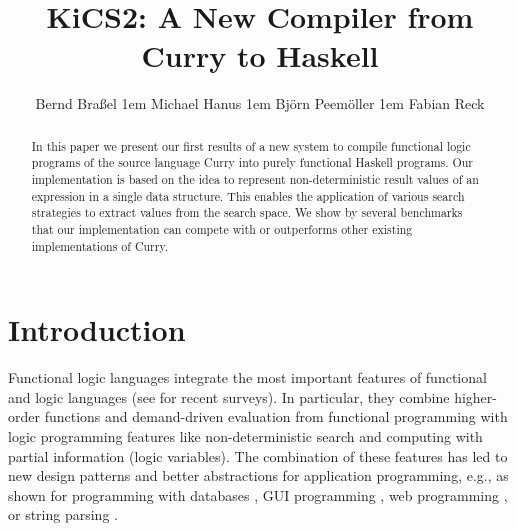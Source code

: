 \documentclass{llncs}
\begin{document}
\pagestyle{plain}
\sloppy

\title{KiCS2: A New Compiler from Curry to Haskell}

\author{
Bernd Bra{\ss}el
\kern1em
Michael Hanus
\kern1em
Bj{\"o}rn Peem{\"o}ller
\kern1em
Fabian Reck
}

\maketitle

\begin{abstract}
In this paper we present our first results of a new system
to compile functional logic programs of the source language Curry
into purely functional Haskell programs.
Our implementation is based on the idea to represent
non-deterministic result values of an expression in a single data structure.
This enables the application of various search strategies
to extract values from the search space.
We show by several benchmarks that our implementation
can compete with or outperforms other existing implementations of Curry.
\end{abstract}


\section{Introduction}
\label{sec:Introduction}

Functional logic languages integrate the most important
features of functional and logic languages
(see \cite{AntoyHanus10CACM,Hanus07ICLP} for recent surveys).
In particular, they combine higher-order functions and demand-driven
evaluation from functional programming with logic programming features
like non-deterministic search and computing with partial information
(logic variables).
The combination of these features
has led to new design patterns \cite{AntoyHanus02FLOPS}
and better abstractions for application programming,
e.g., as shown for programming with databases
\cite{BrasselHanusMueller08PADL,Fischer05},
GUI programming \cite{Hanus00PADL},
web programming \cite{Hanus01PADL,Hanus06PPDP,HanusKoschnicke10PADL},
or string parsing \cite{CaballeroLopez99}.
\end{document}
